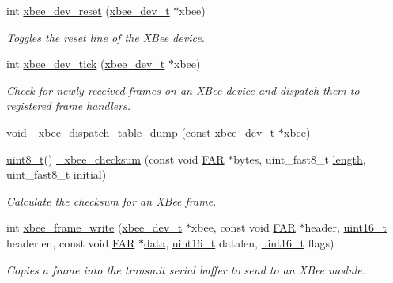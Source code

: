 \begin{DoxyCompactItemize}
int \hyperlink{group__xbee__device_gad312efa700cca7ca044cddf364cc51f5}{xbee\-\_\-dev\-\_\-reset} (\hyperlink{structxbee__dev__t}{xbee\-\_\-dev\-\_\-t} $\ast$xbee)
\begin{DoxyCompactList}\small\item\em Toggles the reset line of the X\-Bee device. \end{DoxyCompactList}\item 
int \hyperlink{group__xbee__device_gaf16e8e532b1eb587794b60222c3a0cce}{xbee\-\_\-dev\-\_\-tick} (\hyperlink{structxbee__dev__t}{xbee\-\_\-dev\-\_\-t} $\ast$xbee)
\begin{DoxyCompactList}\small\item\em Check for newly received frames on an X\-Bee device and dispatch them to registered frame handlers. \end{DoxyCompactList}\item 
void \hyperlink{group__xbee__device_gac7c192386ffce72242c2c8494b261491}{\-\_\-xbee\-\_\-dispatch\-\_\-table\-\_\-dump} (const \hyperlink{structxbee__dev__t}{xbee\-\_\-dev\-\_\-t} $\ast$xbee)
\item 
\hyperlink{group__hal_gae1affc9ca37cfb624959c866a73f83c2}{uint8\-\_\-t}() \hyperlink{group__xbee__device_gac80e0cc51e69ec00731528a04ba8d667}{\-\_\-xbee\-\_\-checksum} (const void \hyperlink{group__hal_gaef060b3456fdcc093a7210a762d5f2ed}{F\-A\-R} $\ast$bytes, uint\-\_\-fast8\-\_\-t \hyperlink{group__zdo_gab2b3adeb2a67e656ff030b56727fd0ac}{length}, uint\-\_\-fast8\-\_\-t initial)
\begin{DoxyCompactList}\small\item\em Calculate the checksum for an X\-Bee frame. \end{DoxyCompactList}\item 
int \hyperlink{group__xbee__device_ga51f281b72bffcc99eec0e8c7f65a5f3f}{xbee\-\_\-frame\-\_\-write} (\hyperlink{structxbee__dev__t}{xbee\-\_\-dev\-\_\-t} $\ast$xbee, const void \hyperlink{group__hal_gaef060b3456fdcc093a7210a762d5f2ed}{F\-A\-R} $\ast$header, \hyperlink{group__hal_ga5a8b2dc9e45a9ee81a94ef304fb62505}{uint16\-\_\-t} headerlen, const void \hyperlink{group__hal_gaef060b3456fdcc093a7210a762d5f2ed}{F\-A\-R} $\ast$\hyperlink{group__xbee__io_gac5955aa1e44ff234e6d78a19cf68f25c}{data}, \hyperlink{group__hal_ga5a8b2dc9e45a9ee81a94ef304fb62505}{uint16\-\_\-t} datalen, \hyperlink{group__hal_ga5a8b2dc9e45a9ee81a94ef304fb62505}{uint16\-\_\-t} flags)
\begin{DoxyCompactList}\small\item\em Copies a frame into the transmit serial buffer to send to an X\-Bee module. \end{DoxyCompactList}\item 

\end{DoxyCompactItemize}
